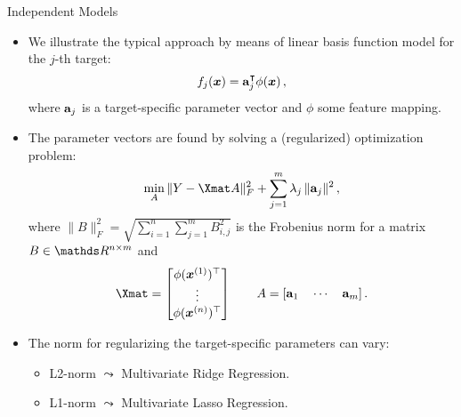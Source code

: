 \begin{frame}{Independent Models}
%	
	\footnotesize
%	
	\begin{itemize}
%		
		\item 	We illustrate the typical approach by means of linear basis function model for the $j$-th target: 
		\begin{equation*}
			f_j(\bm{x}) = \mathbf{a}_j^\intercal \phi(\bm{x}) \,,
			\label{eq:binrel}
		\end{equation*}
%	
		where $\mathbf{a}_j$ is a target-specific parameter vector and $\phi$ some feature mapping.
%
		\item The parameter vectors are found by solving a (regularized) optimization problem: 
%		
		\begin{equation*}
			\label{eq:multiridge}
			\min_A \|Y - \Xmat A \|^2_F +  \sum_{j=1}^m \lambda_j \,\|\ba_j\|^2 \,,
		\end{equation*}
%	
		where $ \| B \|^2_F  = \sqrt{ \sum_{i=1}^n \sum_{j=1}^m B_{i,j}^2 } $ is the Frobenius norm for a matrix $B \in \R^{n \times m}$ and 
%		
		\begin{equation*}
			\label{eq:notation}
			\Xmat = \begin{bmatrix} \phi(\xv^{(1)})^\top \\ \vdots \\ \phi(\xv^{(n)})^\top \end{bmatrix} \qquad A = [\ba_1 \quad \cdots \quad \ba_m] \,.
		\end{equation*}
%
		\item The norm for regularizing the target-specific parameters can vary:
%		
			\begin{itemize} \footnotesize
%				
				\item L2-norm $\leadsto$ Multivariate Ridge Regression.
%				
				\item L1-norm $\leadsto$ Multivariate Lasso Regression.
%				
%				
			\end{itemize}
%	
	\end{itemize}
%
\end{frame}

